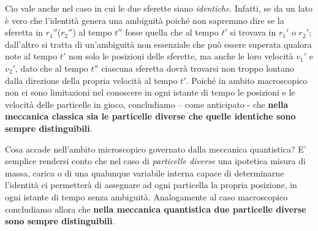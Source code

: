 Cio vale anche nel caso in cui le due sferette siano \emph{identiche}. Infatti, se da un lato è vero che l’identità genera una ambiguità poiché non sapremmo dire se la sferetta in $r_{1}''$($r_{2}''$) al tempo $t''$ fosse quella che al tempo $t'$ si trovava in $r_{1}'$ o $r_{2}'$; dall’altro si tratta di un’ambiguità non essenziale che può essere superata qualora note al tempo $t'$ non solo le posizioni delle sferette, ma anche le loro velocità $v_{1}'$ e $v_{2}'$, dato che al tempo $t''$ ciascuna sferetta dovrà trovarsi non troppo lontano dalla direzione della propria velocità al tempo $t'$. Poiché in ambito macroscopico non ci sono limitazioni nel conoscere in ogni istante di tempo le posizioni e le velocità delle particelle in gioco, concludiamo – come anticipato - che \textbf{nella meccanica classica sia le particelle diverse che quelle identiche sono sempre distinguibili}.
\bigskip

Cosa accade nell’ambito microscopico governato dalla meccanica quantistica? E’ semplice rendersi conto che nel caso di \emph{particelle diverse} una ipotetica misura di massa, carica o di una qualunque variabile interna capace di determinarne l’identità ci permetterà di assegnare ad ogni particella la propria posizione, in ogni istante di tempo senza ambiguità. Analogamente al caso macroscopico concludiamo allora che \textbf{nella meccanica quantistica due particelle diverse sono sempre distinguibili}.

